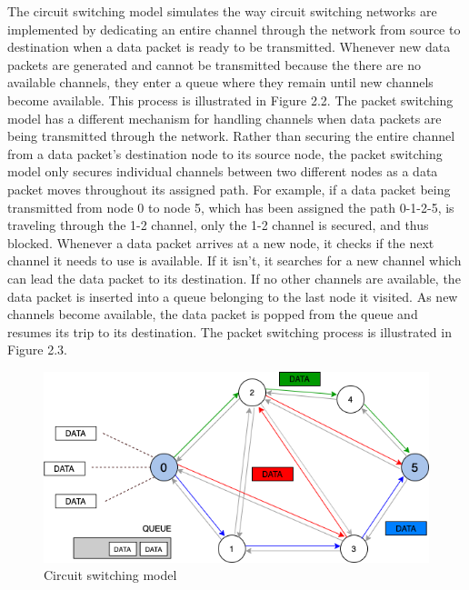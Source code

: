 \documentclass{article}
\begin{document}
  The circuit switching model simulates the way circuit switching networks are implemented by dedicating an entire channel
  through the network from source to destination when a data packet is ready to be transmitted. Whenever new data packets are generated and cannot be transmitted
  because the there are no available channels, they enter a queue where they remain until new channels become available. This
  process is illustrated in Figure 2.2. The packet switching model has a different mechanism for handling channels when data packets
  are being transmitted through the network. Rather than securing the entire channel from a data packet's destination node to its
  source node, the packet switching model only secures individual channels between two different nodes as a data packet moves throughout its
  assigned path. For example, if a data packet being transmitted from node 0 to node 5, which has been assigned the path 0-1-2-5, is
  traveling through the 1-2 channel, only the 1-2 channel is secured, and thus blocked. Whenever a data packet arrives at a new node,
  it checks if the next channel it needs to use is available. If it isn't, it searches for a new channel which can lead the data packet
  to its destination. If no other channels are available, the data packet is inserted into a queue belonging to the last node it
  visited. As new channels become available, the data packet is popped from the queue and resumes its trip to its destination. The
  packet switching process is illustrated in Figure 2.3.

  \begin{figure}[h]
    \centering
    \includegraphics[totalheight=5.5cm]{images/graph_cs.png}
    \renewcommand\figurename{Figure}
    \caption{Circuit switching model}
    \label{fig:graph_cs}
  \end{figure}
\end{document}
